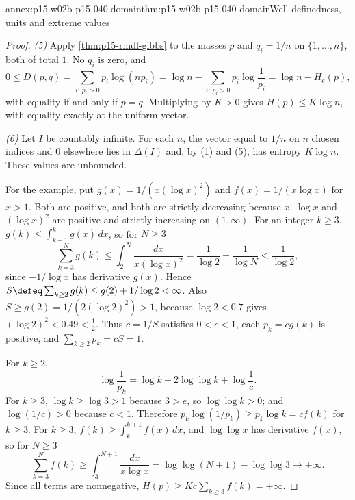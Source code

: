 \begin{annexitem}{annex:p15.w02b-p15-040.domain}{thm:p15-w02b-p15-040-domain}{Well-definedness, units and extreme values}
\begin{proof}
\emph{(5)} Apply \cref{thm:p15-rmdl-gibbs} to the masses \(p\) and
\(q_i=1/n\) on \(\{1,\ldots,n\}\), both of total \(1\). No \(q_i\) is
zero, and
\[
 0\leq D(p,q)=\sum_{i:\,p_i>0}p_i\log(np_i)
   =\log n-\sum_{i:\,p_i>0}p_i\log\frac1{p_i}=\log n-H_e(p),
\]
with equality if and only if \(p=q\). Multiplying by \(K>0\) gives
\(H(p)\leq K\log n\), with equality exactly at the uniform vector.

\emph{(6)} Let \(I\) be countably infinite. For each \(n\), the vector
equal to \(1/n\) on \(n\) chosen indices and \(0\) elsewhere lies in
\(\Delta(I)\) and, by (1) and (5), has entropy \(K\log n\). These values
are unbounded.

For the example, put \(g(x)=1/(x(\log x)^2)\) and
\(f(x)=1/(x\log x)\) for \(x>1\). Both are positive, and both are
strictly decreasing because \(x\), \(\log x\) and \((\log x)^2\) are
positive and strictly increasing on \((1,\infty)\). For an integer
\(k\geq3\), \(g(k)\leq\int_{k-1}^kg(x)\,dx\), so for \(N\geq3\)
\[
 \sum_{k=3}^Ng(k)\leq\int_2^N\frac{dx}{x(\log x)^2}
   =\frac1{\log2}-\frac1{\log N}<\frac1{\log2},
\]
since \(-1/\log x\) has derivative \(g(x)\). Hence
\(S\defeq\sum_{k\geq2}g(k)\leq g(2)+1/\log2<\infty\). Also
\(S\geq g(2)=1/(2(\log2)^2)>1\), because \(\log2<0.7\) gives
\((\log2)^2<0.49<\tfrac12\). Thus \(c=1/S\) satisfies \(0<c<1\), each
\(p_k=cg(k)\) is positive, and \(\sum_{k\geq2}p_k=cS=1\).

For \(k\geq2\),
\[
 \log\frac1{p_k}=\log k+2\log\log k+\log\frac1c .
\]
For \(k\geq3\), \(\log k\geq\log3>1\) because \(3>e\), so
\(\log\log k>0\); and \(\log(1/c)>0\) because \(c<1\). Therefore
\(p_k\log(1/p_k)\geq p_k\log k=cf(k)\) for \(k\geq3\). For \(k\geq3\),
\(f(k)\geq\int_k^{k+1}f(x)\,dx\), and \(\log\log x\) has derivative
\(f(x)\), so for \(N\geq3\)
\[
 \sum_{k=3}^Nf(k)\geq\int_3^{N+1}\frac{dx}{x\log x}
   =\log\log(N+1)-\log\log3\longrightarrow+\infty .
\]
Since all terms are nonnegative,
\(H(p)\geq Kc\sum_{k\geq3}f(k)=+\infty\).
\end{proof}
\end{annexitem}

